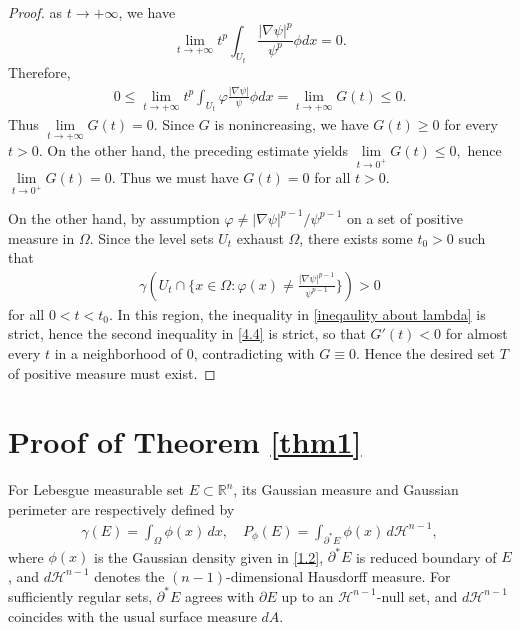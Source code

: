 \documentclass[11pt,leqno]{amsart}
\def\p{\partial}
\def\R{\mathbb{R}}
\def \p {\partial}
\numberwithin{equation}{section}
\begin{document}
\begin{proof}
as $t\rightarrow +\infty$, we have 
\begin{equation*}
\lim\limits_{t\rightarrow +\infty}t^{p}\int_{U_{t}}\frac{|\nabla \psi|^{p}}{\psi^{p}}\phi dx= 0.
\end{equation*}
Therefore, 
\begin{align}
   0\le  \lim_{t\rightarrow +\infty}t^{p}\int_{U_{t}}\varphi\frac{|\nabla\psi|}{\psi}\phi dx=\lim_{t\rightarrow +\infty} G(t)\le 0.
\end{align}
Thus $\lim\limits_{t\rightarrow +\infty}G(t)=0$.  Since 
$G$ is nonincreasing, we have $G(t)\ge 0$ for every $t>0$. On  the other hand, the preceding estimate yields
$
\lim\limits_{t\to 0^+} G(t)\le 0,
$
hence $
\lim\limits_{t\to 0^+} G(t)= 0.
$
Thus we must have
 $G(t)=0$ for all $t>0$. 

 On the other hand, by assumption $\varphi \neq |\nabla \psi|^{p-1}/\psi^{p-1}$ on a set of positive measure  in $\Omega$. Since the level sets $U_t$ exhaust $\Omega$, there exists some $t_0>0$ such that
 \begin{align*}
     \gamma (U_t\cap \{x\in \Omega: \varphi(x)\neq \frac{|\nabla \psi|^{p-1}}{\psi^{p-1}}\})>0
 \end{align*}
 for all $0<t<t_0$. In this region, the inequality in \eqref{ineqaulity about lambda} is strict, hence the second inequality in \eqref{4.4} is strict, so that $G'(t) < 0$ for almost every $t$ in a 
 neighborhood of $0$, contradicting with $G\equiv 0$.  Hence the desired set 
$T$ of positive measure must exist.

\end{proof}

\section{Proof of Theorem \ref{thm1}}\label{sect5}
 For  Lebesgue measurable set $E\subset \R^n$, its Gaussian measure and Gaussian perimeter are respectively defined by
\begin{align*}
\gamma(E)=\int_{\Omega}\phi (x)\,dx, \quad P_{\phi }(E)=\int_{\partial^* E}\phi (x)\,d\mathcal{H}^{n-1},
\end{align*}
where $\phi (x)$ is the Gaussian density given in  \eqref{1.2}, $\p^* E$ is  reduced boundary of $E$, and  $d\mathcal{H}^{n-1}$ denotes the $( n-1)$-dimensional Hausdorff measure. For sufficiently regular sets, $\partial^* E $ agrees with $\partial E$ up to an  $\mathcal H^{n-1}$-null set, and  $d\mathcal H^{n-1}$ coincides with the usual surface measure $dA$.
\end{document}
